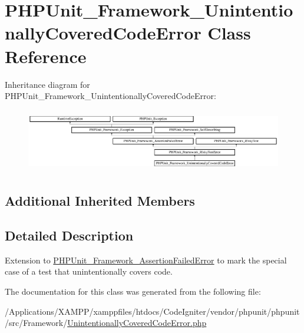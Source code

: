 \hypertarget{class_p_h_p_unit___framework___unintentionally_covered_code_error}{}\section{P\+H\+P\+Unit\+\_\+\+Framework\+\_\+\+Unintentionally\+Covered\+Code\+Error Class Reference}
\label{class_p_h_p_unit___framework___unintentionally_covered_code_error}
Inheritance diagram for P\+H\+P\+Unit\+\_\+\+Framework\+\_\+\+Unintentionally\+Covered\+Code\+Error\+:\begin{figure}[H]
\begin{center}
\leavevmode
\includegraphics[height=2.794411cm]{class_p_h_p_unit___framework___unintentionally_covered_code_error}
\end{center}
\end{figure}
\subsection*{Additional Inherited Members}


\subsection{Detailed Description}
Extension to \mbox{\hyperlink{class_p_h_p_unit___framework___assertion_failed_error}{P\+H\+P\+Unit\+\_\+\+Framework\+\_\+\+Assertion\+Failed\+Error}} to mark the special case of a test that unintentionally covers code. 

The documentation for this class was generated from the following file\+:\begin{DoxyCompactItemize}
\item 
/\+Applications/\+X\+A\+M\+P\+P/xamppfiles/htdocs/\+Code\+Igniter/vendor/phpunit/phpunit/src/\+Framework/\mbox{\hyperlink{_unintentionally_covered_code_error_8php}{Unintentionally\+Covered\+Code\+Error.\+php}}\end{DoxyCompactItemize}
